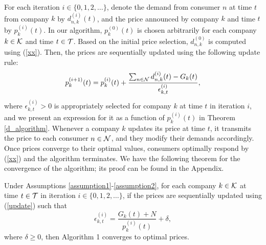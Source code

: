 For each iteration $i\in\{0,1,2,\ldots\}$, denote the demand from consumer $n$ at time $t$ from company $k$ by $d^{(i)}_{n,k}(t)$, and the price announced by company $k$ and time $t$ by $p^{(i)}_k(t)$. In our algorithm,  $p^{(0)}_k(t)$ is chosen arbitrarily for each company $k\in {\cal K}$ and time $t\in{\cal T}$. Based on the initial price selection, $d^{(0)}_{n,k}$ is computed using (\ref{xx}).  Then, the prices are sequentially updated using the following update rule: 
\begin{equation}p^{(i+1)}_k(t)=p^{(i)}_k(t)+\frac{\sum_{n\in {\cal N}}d^{(i)}_{n,k}(t)-G_k(t)}{\epsilon^{(i)}_{k,t}},\label{update}\end{equation}
where $\epsilon^{(i)}_{k,t}>0$ is appropriately selected for company $k$ at time $t$ in iteration $i$, and we present an expression for it as a function of $p^{(i)}_k(t)$ in Theorem \ref{d_algorithm}. 
Whenever a company $k$ updates its price at time $t$, it transmits the price to each consumer $n\in{\cal N}$, and they modify their demands accordingly. Once prices converge to their optimal values, consumers optimally respond by (\ref{xx}) and the algorithm terminates. We have the following theorem for the convergence of the algorithm; its proof can be found in the Appendix.


 \begin{theorem}
Under Assumptions \ref{assumption1}-\ref{assumption2}, for each company $k\in{\cal K}$ at time $t\in{\cal T}$ in iteration $i\in\{0,1,2,\ldots\}$, if the prices are sequentially updated using (\ref{update}) such that
$$ \epsilon^{(i)}_{k,t} =  \frac{G_k(t)+N}{p^{(i)}_k(t)} + \delta,$$
where $\delta\geq0$, then Algorithm 1 converges to optimal prices.
\label{d_algorithm}
 \end{theorem}



